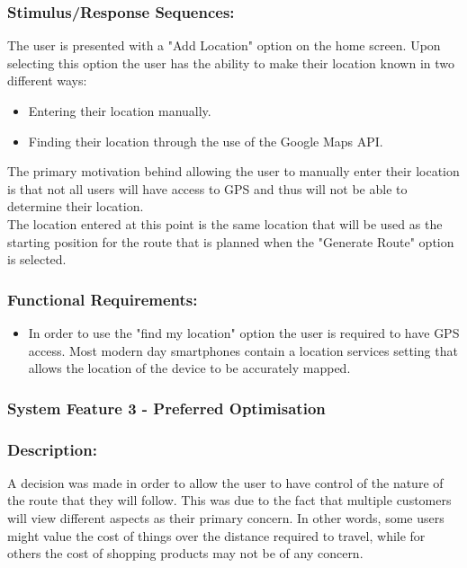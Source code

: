 \documentclass[10pt,twocolumn]{witseiepaper}
\begin{document}
		\subsubsection*{Stimulus/Response Sequences:}
		
		The user is presented with a "Add Location" option on the home screen. Upon selecting this option the user has the ability to make their location known in two different ways:
		
		\begin{itemize}
			\item Entering their location manually.
			\item Finding their location through the use of the Google Maps API.
		\end{itemize}
		
		The primary motivation behind allowing the user to manually enter their location is that not all users will have access to GPS and thus will not be able to determine their location. \\
		
		The location entered at this point is the same location that will be used as the starting position for the route that is planned when the "Generate Route" option is selected.
		
		\subsubsection*{Functional Requirements:}
		
		\begin{itemize}
			\item In order to use the "find my location" option the user is required to have GPS access. Most modern day smartphones contain a location services setting that allows the location of the device to be accurately mapped. 
		\end{itemize}
		
		\subsubsection{System Feature 3 - Preferred Optimisation}
		
		\subsubsection*{Description:}
		
		A decision was made in order to allow the user to have control of the nature of the route that they will follow. This was due to the fact that multiple customers will view different aspects as their primary concern. In other words, some users might value the cost of things over the distance required to travel, while for others the cost of shopping products may not be of any concern. 
		
\end{document}
